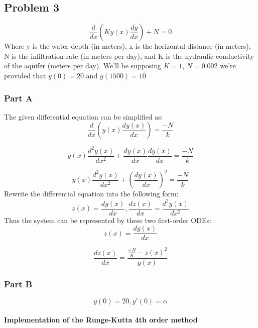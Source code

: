 \documentclass[11pt]{article}
\begin{document}
\hypertarget{problem-3}{%
\subsection{Problem 3}\label{problem-3}}

\[\frac{d}{dx}(Ky(x)\frac{dy}{dx})+N=0\] Where y is the water depth (in
meters), x is the horizontal distance (in meters), N is the infiltration
rate (in meters per day), and K is the hydraulic conductivity of the
aquifer (meters per day). We'll be supposing \(K=1\), \(N=0.002\) we're
provided that \(y(0)=20\) and \(y(1500)=10\)

\hypertarget{part-a}{%
\subsubsection{Part A}\label{part-a}}

The given differential equation can be simplified as:
\[\frac{d}{dx}(y(x)\frac{dy(x)}{dx})=\frac{-N}{k}\]

\[y(x)\frac{d^2y(x)}{dx^2}+\frac{dy(x)}{dx}\frac{dy(x)}{dx}=\frac{-N}{k}\]

\[y(x)\frac{d^2y(x)}{dx^2}+(\frac{dy(x)}{dx})^2=\frac{-N}{k}\] Rewrite
the differential equation into the following form:
\[z(x)=\frac{dy(x)}{dx}, \frac{dz(x)}{dx}=\frac{d^2y(x)}{dx^2}\] Thus
the system can be represented by these two first-order ODEs:
\[z(x)=\frac{dy(x)}{dx}\]

\[\frac{dz(x)}{dx}=\frac{\frac{-N}{K}-z(x)^2}{y(x)}\]

\hypertarget{part-b}{%
\subsubsection{Part B}\label{part-b}}

\[y(0)=20, y'(0)=\alpha\]

\hypertarget{implementation-of-the-runge-kutta-4th-order-method}{%
\paragraph{Implementation of the Runge-Kutta 4th order
method}\label{implementation-of-the-runge-kutta-4th-order-method}}
\end{document}

